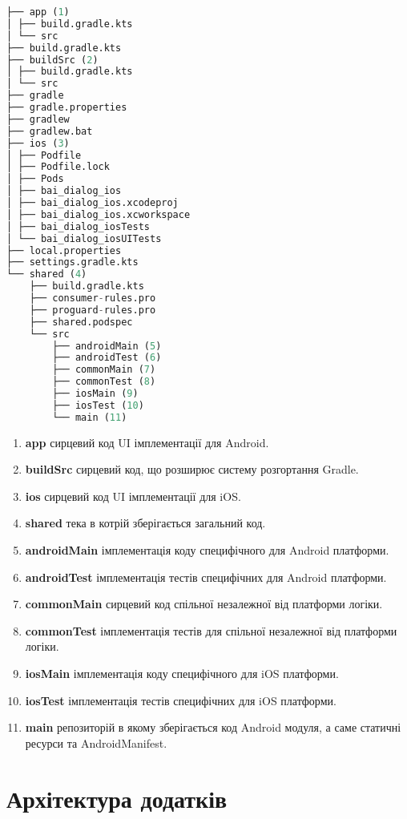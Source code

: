 \begin{lstlisting}[style=light, language=Python,label={lst:kmm_project_layout},caption=KMM Project Layout]
├── app (1)
│ ├── build.gradle.kts
│ └── src
├── build.gradle.kts
├── buildSrc (2)
│ ├── build.gradle.kts
│ └── src
├── gradle
├── gradle.properties
├── gradlew
├── gradlew.bat
├── ios (3)
│ ├── Podfile
│ ├── Podfile.lock
│ ├── Pods
│ ├── bai_dialog_ios
│ ├── bai_dialog_ios.xcodeproj
│ ├── bai_dialog_ios.xcworkspace
│ ├── bai_dialog_iosTests
│ └── bai_dialog_iosUITests
├── local.properties
├── settings.gradle.kts
└── shared (4)
    ├── build.gradle.kts
    ├── consumer-rules.pro
    ├── proguard-rules.pro
    ├── shared.podspec
    └── src
        ├── androidMain (5)
        ├── androidTest (6)
        ├── commonMain (7)
        ├── commonTest (8)
        ├── iosMain (9)
        ├── iosTest (10)
        └── main (11)
\end{lstlisting}

\begin{enumerate}
    \item \textbf{app} сирцевий код UI імплементації для Android.
    \item \textbf{buildSrc} сирцевий код, що розширює систему розгортання Gradle.
    \item \textbf{ios} сирцевий код UI імплементації для iOS.
    \item \textbf{shared} тека в котрій зберігається загальний код.
    \item \textbf{androidMain} імплементація коду специфічного для Android платформи.
    \item \textbf{androidTest} імплементація тестів специфічних для Android платформи.
    \item \textbf{commonMain} сирцевий код спільної незалежної від платформи логіки.
    \item \textbf{commonTest} імплементація тестів для спільної незалежної від платформи логіки.
    \item \textbf{iosMain} імплементація коду специфічного для iOS платформи.
    \item \textbf{iosTest} імплементація тестів специфічних для iOS платформи.
    \item \textbf{main} репозиторій в якому зберігається код Android модуля, а саме статичні ресурси та AndroidManifest.
\end{enumerate}


\section{Архітектура додатків}
\label{sec:general_app_architecture}

